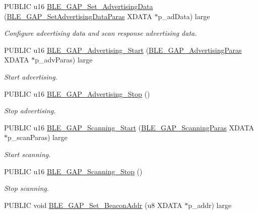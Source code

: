 \begin{DoxyCompactItemize}
P\+U\+B\+L\+IC u16 \hyperlink{group___b_l_e___g_a_p_gadc9aba835841eda025b79face77762cf}{B\+L\+E\+\_\+\+G\+A\+P\+\_\+\+Set\+\_\+\+Advertising\+Data} (\hyperlink{struct_b_l_e___g_a_p___set_advertising_data_paras}{B\+L\+E\+\_\+\+G\+A\+P\+\_\+\+Set\+Advertising\+Data\+Paras} X\+D\+A\+TA $\ast$p\+\_\+ad\+Data) large
\begin{DoxyCompactList}\small\item\em Configure advertising data and scan response advertising data. \end{DoxyCompactList}\item 
P\+U\+B\+L\+IC u16 \hyperlink{group___b_l_e___g_a_p_ga550d485e9c70ed710386d35df9a28aa1}{B\+L\+E\+\_\+\+G\+A\+P\+\_\+\+Advertising\+\_\+\+Start} (\hyperlink{struct_b_l_e___g_a_p___advertising_paras}{B\+L\+E\+\_\+\+G\+A\+P\+\_\+\+Advertising\+Paras} X\+D\+A\+TA $\ast$p\+\_\+adv\+Paras) large
\begin{DoxyCompactList}\small\item\em Start advertising. \end{DoxyCompactList}\item 
P\+U\+B\+L\+IC u16 \hyperlink{group___b_l_e___g_a_p_gacafa41b96c73a0f88c469549b1312de6}{B\+L\+E\+\_\+\+G\+A\+P\+\_\+\+Advertising\+\_\+\+Stop} ()
\begin{DoxyCompactList}\small\item\em Stop advertising. \end{DoxyCompactList}\item 
P\+U\+B\+L\+IC u16 \hyperlink{group___b_l_e___g_a_p_gabf7e42602a15b7a4a0d8c4cfce53bc3c}{B\+L\+E\+\_\+\+G\+A\+P\+\_\+\+Scanning\+\_\+\+Start} (\hyperlink{struct_b_l_e___g_a_p___scanning_paras}{B\+L\+E\+\_\+\+G\+A\+P\+\_\+\+Scanning\+Paras} X\+D\+A\+TA $\ast$p\+\_\+scan\+Paras) large
\begin{DoxyCompactList}\small\item\em Start scanning. \end{DoxyCompactList}\item 
P\+U\+B\+L\+IC u16 \hyperlink{group___b_l_e___g_a_p_ga29478317bd7e82ca5f4e8fc912745373}{B\+L\+E\+\_\+\+G\+A\+P\+\_\+\+Scanning\+\_\+\+Stop} ()
\begin{DoxyCompactList}\small\item\em Stop scanning. \end{DoxyCompactList}\item 
P\+U\+B\+L\+IC void \hyperlink{group___b_l_e___g_a_p_ga502bf698f18bcd40c3fad8de8a5fda41}{B\+L\+E\+\_\+\+G\+A\+P\+\_\+\+Set\+\_\+\+Beacon\+Addr} (u8 X\+D\+A\+TA $\ast$p\+\_\+addr) large

\end{DoxyCompactItemize}
